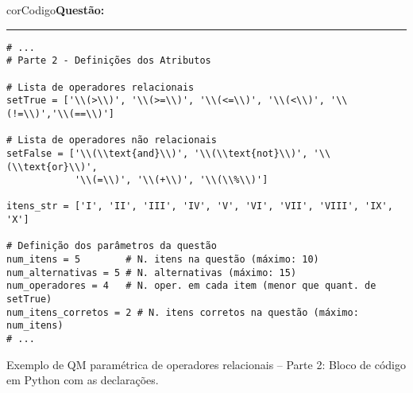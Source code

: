 \begin{listing}[!ht]
    \begin{myboxCode}{corCodigo}{\textbf{Questão: }}\vspace{3mm}
    \hrule
    \begin{verbatim}
# ...
# Parte 2 - Definições dos Atributos

# Lista de operadores relacionais
setTrue = ['\\(>\\)', '\\(>=\\)', '\\(<=\\)', '\\(<\\)', '\\(!=\\)','\\(==\\)']

# Lista de operadores não relacionais
setFalse = ['\\(\\text{and}\\)', '\\(\\text{not}\\)', '\\(\\text{or}\\)',  
            '\\(=\\)', '\\(+\\)', '\\(\\%\\)']

itens_str = ['I', 'II', 'III', 'IV', 'V', 'VI', 'VII', 'VIII', 'IX', 'X']

# Definição dos parâmetros da questão
num_itens = 5        # N. itens na questão (máximo: 10)
num_alternativas = 5 # N. alternativas (máximo: 15)
num_operadores = 4   # N. oper. em cada item (menor que quant. de setTrue)
num_itens_corretos = 2 # N. itens corretos na questão (máximo: num_itens)
# ...
\end{verbatim}
\end{myboxCode}
\caption{Exemplo de QM paramétrica de operadores relacionais -- Parte 2: Bloco de código em Python com as declarações.}
\label{lst:questaoQM_Extra1_parte2}
\end{listing}

